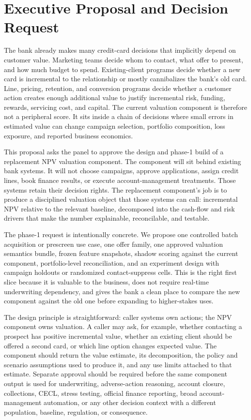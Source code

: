 \documentclass[11pt]{article}
\newcommand{\1}{\mathbf{1}}
\begin{document}
\section{Executive Proposal and Decision Request}
\label{sec:executive-charter}

The bank already makes many credit-card decisions that implicitly depend on
customer value. Marketing teams decide whom to contact, what offer to present,
and how much budget to spend. Existing-client programs decide whether a new
card is incremental to the relationship or mostly cannibalizes the bank's old
card. Line, pricing, retention, and conversion programs decide whether a
customer action creates enough additional value to justify incremental risk,
funding, rewards, servicing cost, and capital. The current valuation component
is therefore not a peripheral score. It sits inside a chain of decisions where
small errors in estimated value can change campaign selection, portfolio
composition, loss exposure, and reported business economics.

This proposal asks the panel to approve the design and phase-1 build of a
replacement NPV valuation component. The component will sit behind existing
bank systems. It will not choose campaigns, approve applications, assign credit
lines, book finance results, or execute account-management treatments. Those
systems retain their decision rights. The replacement component's job is to
produce a disciplined valuation object that those systems can call: incremental
NPV relative to the relevant baseline, decomposed into the cash-flow and risk
drivers that make the number explainable, reconcilable, and testable.

The phase-1 request is intentionally concrete. We propose one controlled batch
acquisition or prescreen use case, one offer family, one approved valuation
semantics bundle, frozen feature snapshots, shadow scoring against the current
component, portfolio-level reconciliation, and an experiment design with
campaign holdouts or randomized contact-suppress cells. This is the right first
slice because it is valuable to the business, does not require real-time
underwriting dependency, and gives the bank a clean place to compare the new
component against the old one before expanding to higher-stakes uses.

The design principle is straightforward: caller systems own actions; the NPV
component owns valuation. A caller may ask, for example, whether contacting a
prospect has positive incremental value, whether an existing client should be
offered a second card, or which line option changes expected value. The
component should return the value estimate, its decomposition, the policy and
scenario assumptions used to produce it, and any use limits attached to that
estimate. Separate approval should be required before the same component output
is used for underwriting, adverse-action reasoning, account closure,
collections, CECL, stress testing, official finance reporting, broad
account-management automation, or any other decision context with a different
population, baseline, regulation, or consequence.
\end{document}
